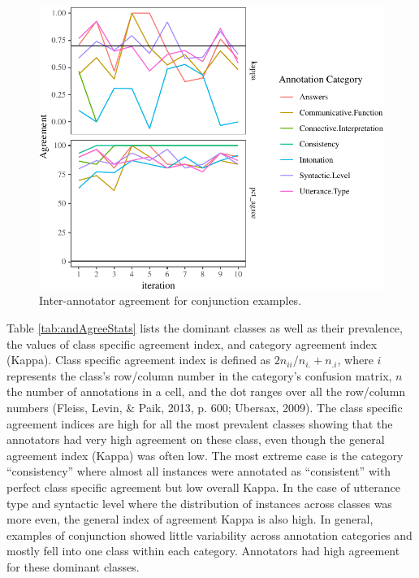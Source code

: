 \documentclass[floatsintext,man]{apa6}
\theoremstyle{definition}
\theoremstyle{definition}
\theoremstyle{definition}
\theoremstyle{remark}
\begin{document}
\begin{figure}[tb]

{\centering \includegraphics{figs/andReliabilityPlot-1} 

}

\caption{Inter-annotator agreement for conjunction examples.}\label{fig:andReliabilityPlot}
\end{figure}

Table \ref{tab:andAgreeStats} lists the dominant classes as well as
their prevalence, the values of class specific agreement index, and
category agreement index (Kappa). Class specific agreement index is
defined as \(2n_{ii}/n_{i.}+n_{.i}\), where \(i\) represents the class's
row/column number in the category's confusion matrix, \(n\) the number
of annotations in a cell, and the dot ranges over all the row/column
numbers (Fleiss, Levin, \& Paik, 2013, p. 600; Ubersax, 2009). The class
specific agreement indices are high for all the most prevalent classes
showing that the annotators had very high agreement on these class, even
though the general agreement index (Kappa) was often low. The most
extreme case is the category \enquote{consistency} where almost all
instances were annotated as \enquote{consistent} with perfect class
specific agreement but low overall Kappa. In the case of utterance type
and syntactic level where the distribution of instances across classes
was more even, the general index of agreement Kappa is also high. In
general, examples of conjunction showed little variability across
annotation categories and mostly fell into one class within each
category. Annotators had high agreement for these dominant classes.
\end{document}
